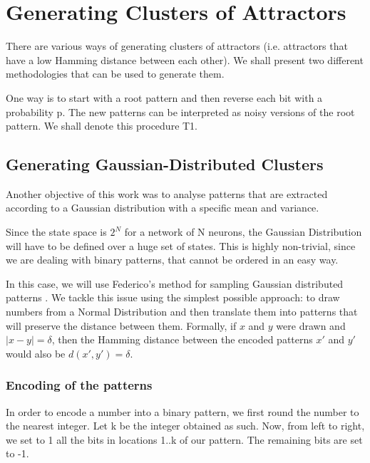 

\section{Generating Clusters of Attractors}

There are various ways of generating clusters of attractors (i.e. attractors that have a low Hamming distance between each other). We shall present two different methodologies that can be used to generate them.

One way is to start with a root pattern and then reverse each bit with a probability p. The new patterns can be interpreted as noisy versions of the root pattern. We shall denote this procedure T1.

\subsection{Generating Gaussian-Distributed Clusters}

Another objective of this work was to analyse patterns that are extracted according to a Gaussian distribution with a specific mean and variance.


Since the state space is \( 2^N \) for a network of N neurons, the Gaussian Distribution will have to be defined over a huge set of states. This is highly non-trivial, since we are dealing with binary patterns, that cannot be ordered in an easy way.

In this case, we will use Federico's method for sampling Gaussian distributed patterns \cite[p.~33]{federico}. We tackle this issue using the simplest possible approach: to draw numbers from a Normal Distribution and then translate them into patterns that will preserve the distance between them. Formally, if \(x\) and \(y\) were drawn and \( |x-y|=\delta\), then the Hamming distance between the encoded patterns \(x'\) and \(y'\) would also be \( d(x',y')=\delta\).

\subsubsection{Encoding of the patterns}

In order to encode a number into a binary pattern, we first round the number to the nearest integer. Let k be the integer obtained as such. Now, from left to right, we set to 1 all the bits in locations 1..k of our pattern. The remaining bits are set to -1.

